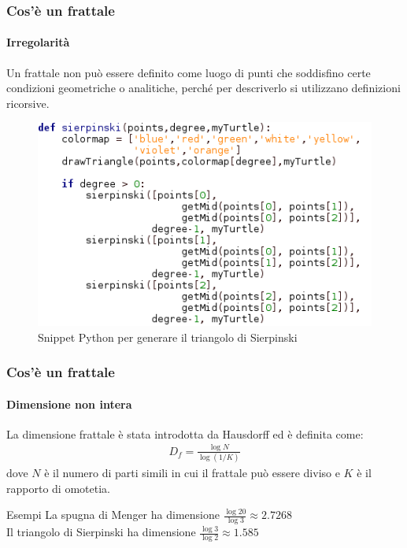 \documentclass{beamer}
\begin{document}
		\begin{frame}
			\frametitle{Cos'è un frattale}
			\framesubtitle{Irregolarità}
			Un frattale non può essere definito come luogo di punti che soddisfino certe condizioni geometriche o analitiche, perché per descriverlo si utilizzano definizioni ricorsive.
			\begin{figure}[h]
				\centering
				\includegraphics[width=0.7\linewidth]{"../Triangolo di Sierpinski/sierpinski_triangle_algo"}
				\caption{Snippet Python per generare il triangolo di Sierpinski}
				\label{fig:sierpinskitrianglealgo}
			\end{figure}

		\end{frame}
		\begin{frame}
			\frametitle{Cos'è un frattale}
			\framesubtitle{Dimensione non intera}
			La dimensione frattale è stata introdotta da Hausdorff ed è definita come:
			\begin{gather*}
			D_f = \frac{\log N}{\log ( 1 / K )}
			\end{gather*}
			dove $N$ è il numero di parti simili in cui il frattale può essere diviso e $K$ è il rapporto di omotetia.
			\begin{block}{Esempi}
				La spugna di Menger ha dimensione $\frac{\log20}{\log3} \approx 2.7268$\\
				Il triangolo di Sierpinski ha dimensione $\frac{\log3}{\log2} \approx 1.585$
			\end{block}
		\end{frame}
\end{document}
